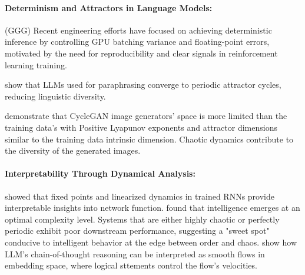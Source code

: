 \documentclass[a4paper,12pt]{article}
\begin{document}
\paragraph{Determinism and Attractors in Language Models:}
\cite{he2025nondeterminism} (GGG)
Recent engineering efforts have focused on achieving deterministic inference by controlling GPU batching variance and floating-point errors, motivated by the need for reproducibility and clear signals in reinforcement learning training. 

\cite{wang2025unveiling_attractor_cycles} show that LLMs used for paraphrasing converge to periodic attractor cycles, reducing linguistic diversity.

\cite{cyclegan} %
demonstrate that CycleGAN image generators' space is more limited than the training data's with Positive Lyapunov exponents and attractor dimensions similar to the training data intrinsic dimension. Chaotic dynamics contribute to the diversity of the generated images.

\paragraph{Interpretability Through Dynamical Analysis:}
\label{par:interpretability_dynamics}
\cite{sussillo2013} showed that fixed points and linearized dynamics in trained RNNs provide interpretable insights into network function. \cite{zhang2024intelligence_edge_of_chaos} found that intelligence emerges at an optimal complexity level. Systems that are either highly chaotic or perfectly periodic exhibit poor downstream performance, suggesting a "sweet spot" conducive to intelligent behavior at the edge between order and chaos. \cite{zhou2025geometryreasoningflowinglogics} show how LLM's chain-of-thought reasoning can be interpreted as smooth flows in embedding space, where logical sttements control the flow's velocities.
\end{document}
